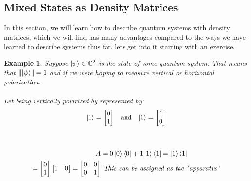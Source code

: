 \documentclass[12pt]{article}
\theoremstyle{plain}
\theoremstyle{nonumberplain}
\theoremstyle{plain}
\newtheorem{example}[lemma]{Example}
\theoremstyle{nonumberplain}
\newcommand\1{{\bf 1}}
\newcommand{\bmat}[1]{\begin{bmatrix*} #1 \end{bmatrix*}} %
\newcommand{\C}{\mathbb{C}} %
\newcommand{\<}{\left\langle}
\renewcommand{\>}{\right\rangle}
\newcommand{\norm}[1]{\left\lVert#1\right\rVert} %
\begin{document}
\pagebreak

\subsection{Mixed States as Density Matrices}
In this section, we will learn how to describe quantum systems with density matrices, which we will find has many advantages compared to the ways we have learned to describe systems thus far, lets get into it starting with an exercise.

\begin{example}
Suppose $\ket{\psi} \in \C^2$ is the state of some quantum system. That means that $\norm{\ket{\psi}} = 1$ and if we were hoping to measure vertical or horizontal polarization.  \\
\\
Let being vertically polarized by represented by: 
\begin{align*}
\ket{1} &= \bmat{0 \\1} & \text{a}&\text{nd} & \ket{0} &= \bmat{1 \\0}\\
\end{align*}
\begin{center}
\\
\end{center}

\begin{align*}
A &= 0\ket{0}\bra{0} + 1\ket{1}\bra{1} =  \ket{1}\bra{1}\\
= \bmat{0\\1}\bmat{1&0} = \bmat{0&0\\0&1} &\textit{ This can be assigned as the "apparatus"}
\end{align*}
\end{example}
\end{document}
